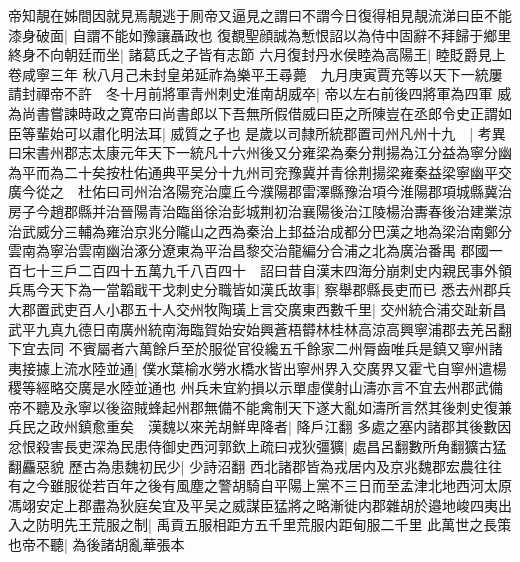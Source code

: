 帝知靚在姊間因就見焉靚逃于厠帝又逼見之謂曰不謂今日復得相見靚流涕曰臣不能漆身破面|{
	自謂不能如豫讓聶政也}
復覩聖顔誠為慙恨詔以為侍中固辭不拜歸于鄉里終身不向朝廷而坐|{
	諸葛氏之子皆有志節}
六月復封丹水侯睦為高陽王|{
	睦貶爵見上卷咸寧三年}
秋八月己未封皇弟延祚為樂平王尋薨　九月庚寅賈充等以天下一統屢請封禪帝不許　冬十月前將軍青州刺史淮南胡威卒|{
	帝以左右前後四將軍為四軍}
威為尚書嘗諫時政之寛帝曰尚書郎以下吾無所假借威曰臣之所陳豈在丞郎令史正謂如臣等輩始可以肅化明法耳|{
	威質之子也}
是歲以司隸所統郡置司州凡州十九　|{
	考異曰宋書州郡志太康元年天下一統凡十六州後又分雍梁為秦分荆揚為江分益為寧分幽為平而為二十矣按杜佑通典平吴分十九州司兖豫冀并青徐荆揚梁雍秦益梁寧幽平交廣今從之　杜佑曰司州治洛陽兖治廩丘今濮陽郡雷澤縣豫治項今淮陽郡項城縣冀治房子今趙郡縣并治晉陽青治臨甾徐治彭城荆初治襄陽後治江陵楊治夀春後治建業涼治武威分三輔為雍治京兆分隴山之西為秦治上邽益治成都分巴漢之地為梁治南鄭分雲南為寧治雲南幽治涿分遼東為平治昌黎交治龍編分合浦之北為廣治番禺}
郡國一百七十三戶二百四十五萬九千八百四十　詔曰昔自漢末四海分崩刺史内親民事外領兵馬今天下為一當韜戢干戈刺史分職皆如漢氏故事|{
	察舉郡縣長吏而已}
悉去州郡兵大郡置武吏百人小郡五十人交州牧陶璜上言交廣東西數千里|{
	交州統合浦交趾新昌武平九真九德日南廣州統南海臨賀始安始興蒼梧欎林桂林高涼高興寧浦郡去羌呂翻下宜去同}
不賓屬者六萬餘戶至於服從官役纔五千餘家二州脣齒唯兵是鎮又寧州諸夷接據上流水陸並通|{
	僕水葉榆水勞水橋水皆出寧州界入交廣界又霍弋自寧州遣楊稷等經略交廣是水陸並通也}
州兵未宜約損以示單虛僕射山濤亦言不宜去州郡武備帝不聽及永寧以後盜賊蜂起州郡無備不能禽制天下遂大亂如濤所言然其後刺史復兼兵民之政州鎮愈重矣　漢魏以來羌胡鮮卑降者|{
	降戶江翻}
多處之塞内諸郡其後數因忿恨殺害長吏深為民患侍御史西河郭欽上疏曰戎狄彊獷|{
	處昌呂翻數所角翻獷古猛翻麤惡貌}
歷古為患魏初民少|{
	少詩沼翻}
西北諸郡皆為戎居内及京兆魏郡宏農往往有之今雖服從若百年之後有風塵之警胡騎自平陽上黨不三日而至孟津北地西河太原馮翊安定上郡盡為狄庭矣宜及平吴之威謀臣猛將之略漸徙内郡雜胡於邉地峻四夷出入之防明先王荒服之制|{
	禹貢五服相距方五千里荒服内距甸服二千里}
此萬世之長策也帝不聽|{
	為後諸胡亂華張本}


